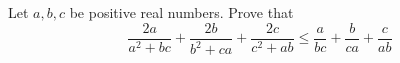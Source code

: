 Let $a,b,c$ be positive real numbers. Prove that\[ \frac{2a}{a^{2}+bc}+\frac{2b}{b^{2}+ca}+\frac{2c}{c^{2}+ab}\leq\frac{a}{bc}+\frac{b}{ca}+\frac{c}{ab} \]